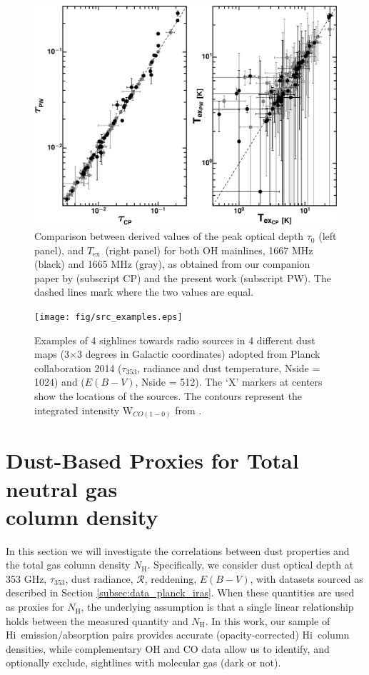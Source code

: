 \documentclass[preprint]{emulateapj}
\def\ebv{$E(B{-}V)$}
\def\hi{H{\sc i}}
\def\NH{$N_\mathrm{H}$}
\def\Tex{$T_{\mathrm{ex}}$}
\def\t353{$\tau_{353}$}
\def\rad{$\mathcal{R}$}
\begin{document}
\begin{figure}
\includegraphics[width=1.0\linewidth]{fig/tex_tau_compare.eps}
\caption{Comparison between derived values of the peak optical depth $\tau_0$ (left panel), and \Tex\ (right panel) for both OH mainlines, 1667 MHz (black) and 1665 MHz (gray), as obtained from our companion paper by \citet{Li2017} (subscript CP) and the present work (subscript PW). The dashed lines mark where the two values are equal.}
\label{fig:tex_tau_compare}
\end{figure}

\begin{figure}
 \center
  \texttt{[image: fig/src\_examples.eps]}
  \caption{Examples of 4 sighlines towards radio sources in 4 different dust maps (3$\times$3 degrees in Galactic coordinates) adopted from Planck collaboration 2014 ($\tau_{353}$, radiance and dust temperature, Nside = 1024) and \citealt{Schlafly2011} (\ebv, Nside = 512). The `X' markers at centers show the locations of the sources. The contours represent the integrated intensity W$_{CO(1-0)}$ from \citealt{Dame2001}.}
  \label{fig:src_examples}
\end{figure}

\section{Dust-Based Proxies for Total neutral gas\\ column density}
\label{sec:proxies-for-nh}
In this section we will investigate the correlations between dust properties and the total gas column density \NH. Specifically, we consider dust optical depth at 353 GHz, \t353, dust radiance, \rad, reddening, \ebv, with datasets sourced as described in Section \ref{subsec:data_planck_iras}. When these quantities are used as proxies for \NH, the underlying assumption is that a single linear relationship holds between the measured quantity and \NH. In this work, our sample of \hi\ emission/absorption pairs provides accurate (opacity-corrected) \hi\ column densities, while complementary OH and CO data allow us to identify, and optionally exclude, sightlines with molecular gas (dark or not). 
\end{document}
